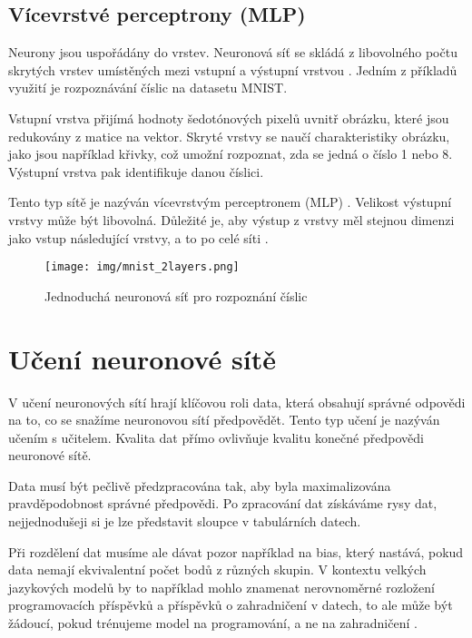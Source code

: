 \documentclass[FM,DP]{tulthesis}
\begin{document}
		\subsection{Vícevrstvé perceptrony (MLP)}
		Neurony jsou uspořádány do vrstev. Neuronová síť se skládá z libovolného počtu skrytých vrstev umístěných mezi vstupní a výstupní vrstvou \cite{neuralnetwork101}. Jedním z příkladů využití je rozpoznávání číslic na datasetu MNIST.
		
		Vstupní vrstva přijímá hodnoty šedotónových pixelů uvnitř obrázku, které jsou redukovány z matice na vektor. Skryté vrstvy se naučí charakteristiky obrázku, jako jsou například křivky, což umožní rozpoznat, zda se jedná o číslo 1 nebo 8. Výstupní vrstva pak identifikuje danou číslici.
		
		Tento typ sítě je nazýván vícevrstvým perceptronem (MLP) \cite{mnist}. Velikost výstupní vrstvy může být libovolná. Důležité je, aby výstup z vrstvy měl stejnou dimenzi jako vstup následující vrstvy, a to po celé síti \cite{mnist}.
		
		\begin{figure}[H]
			\centering
			\texttt{[image: img/mnist\_2layers.png]}
			\caption{Jednoduchá neuronová síť pro rozpoznání číslic \cite{mnist}}
			\label{fig:mnist}
		\end{figure}
		
		\section{Učení neuronové sítě} \label{training}
		V učení neuronových sítí hrají klíčovou roli data, která obsahují správné odpovědi na to, co se snažíme neuronovou sítí předpovědět. Tento typ učení je nazýván učením s učitelem. Kvalita dat přímo ovlivňuje kvalitu konečné předpovědi neuronové sítě.
		
		Data musí být pečlivě předzpracována tak, aby byla maximalizována pravděpodobnost správné předpovědi. Po zpracování dat získáváme rysy dat, nejjednodušeji si je lze představit sloupce v tabulárních datech. 
		
		Při rozdělení dat musíme ale dávat pozor například na bias, který nastává, pokud data nemají ekvivalentní počet bodů z různých skupin. V kontextu velkých jazykových modelů by to například mohlo znamenat nerovnoměrné rozložení programovacích příspěvků a příspěvků o zahradničení v datech, to ale může být žádoucí, pokud trénujeme model na programování, a ne na zahradničení \cite{rubiks_code}.
		
\end{document}
